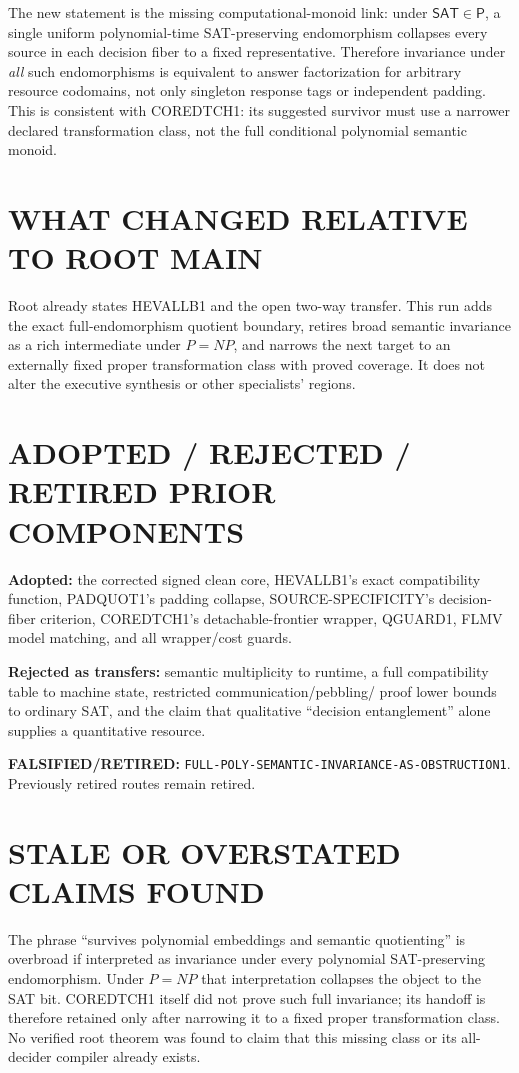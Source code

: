 \documentclass[11pt]{article}
\newcommand{\SAT}{\mathsf{SAT}}
\begin{document}
The new statement is the missing computational-monoid link: under
$\SAT\in\mathsf P$, a single uniform polynomial-time SAT-preserving
endomorphism collapses every source in each decision fiber to a fixed
representative.  Therefore invariance under \emph{all} such endomorphisms is
equivalent to answer factorization for arbitrary resource codomains, not only
singleton response tags or independent padding.  This is consistent with
COREDTCH1: its suggested survivor must use a narrower declared transformation
class, not the full conditional polynomial semantic monoid.

\section{WHAT CHANGED RELATIVE TO ROOT MAIN}

Root  already states HEVALLB1 and the open two-way transfer.
This run adds the exact full-endomorphism quotient boundary, retires broad
semantic invariance as a rich intermediate under $P=NP$, and narrows the
next target to an externally fixed proper transformation class with proved
coverage.  It does not alter the executive synthesis or other specialists'
regions.

\section{ADOPTED / REJECTED / RETIRED PRIOR COMPONENTS}

\textbf{Adopted:} the corrected signed clean core, HEVALLB1's exact
compatibility function, PADQUOT1's padding collapse, SOURCE-SPECIFICITY's
decision-fiber criterion, COREDTCH1's detachable-frontier wrapper, QGUARD1,
FLMV model matching, and all wrapper/cost guards.

\textbf{Rejected as transfers:} semantic multiplicity to runtime, a full
compatibility table to machine state, restricted communication/pebbling/
proof lower bounds to ordinary SAT, and the claim that qualitative
``decision entanglement'' alone supplies a quantitative resource.

\textbf{FALSIFIED/RETIRED:}
\texttt{FULL-POLY-SEMANTIC-INVARIANCE-AS-OBSTRUCTION1}.  Previously retired
routes remain retired.

\section{STALE OR OVERSTATED CLAIMS FOUND}

The phrase ``survives polynomial embeddings and semantic quotienting'' is
overbroad if interpreted as invariance under every polynomial SAT-preserving
endomorphism.  Under $P=NP$ that interpretation collapses the object to the
SAT bit.  COREDTCH1 itself did not prove such full invariance; its handoff is
therefore retained only after narrowing it to a fixed proper transformation
class.  No verified root theorem was found to claim that this missing class
or its all-decider compiler already exists.
\end{document}
